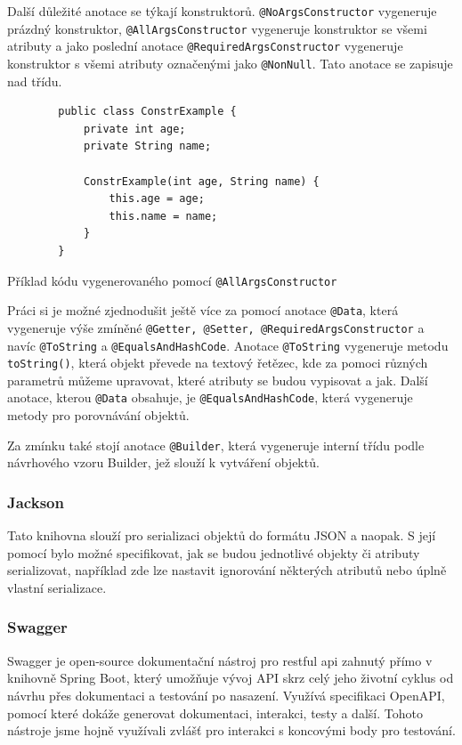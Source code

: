 Další důležité anotace se týkají konstruktorů. \texttt{@NoArgsConstructor} vygeneruje prázdný konstruktor, \texttt{@AllArgsConstructor} vygeneruje konstruktor se všemi atributy  a jako poslední anotace \texttt{@RequiredArgsConstructor} vygeneruje konstruktor s všemi atributy označenými jako \texttt{@NonNull}. Tato anotace se zapisuje nad třídu. \cite{lombok:constructor}

\begin{listing}[h!]
    \begin{verbatim}
        public class ConstrExample {
            private int age;
            private String name;

            ConstrExample(int age, String name) {
                this.age = age;
                this.name = name;
            }
        }
    \end{verbatim}
    \caption{Příklad kódu vygenerovaného pomocí \texttt{@AllArgsConstructor}}
    \label{code:lombok:constructor}
\end{listing}


Práci si je možné zjednodušit ještě více za pomocí anotace \texttt{@Data}, která vygeneruje výše zmíněné \texttt{@Getter, @Setter, @RequiredArgsConstructor} a navíc \texttt{@ToString} a \texttt{@EqualsAndHashCode}.\cite{lombok:data} Anotace \texttt{@ToString} vygeneruje metodu \texttt{toString()}, která objekt převede na textový řetězec, kde za pomoci různých parametrů můžeme upravovat, které atributy se budou vypisovat a jak. Další anotace, kterou \texttt{@Data} obsahuje, je \texttt{@EqualsAndHashCode}, která vygeneruje metody pro porovnávání objektů.

Za zmínku také stojí anotace \texttt{@Builder}, která vygeneruje interní třídu podle návrhového vzoru Builder\cite{refactoringGuru:builder}, jež slouží k vytváření objektů. \cite{lombok:builder}

\subsubsection*{Jackson}\label{sec:impl:jackson}
Tato knihovna slouží pro serializaci objektů do formátu JSON  a naopak. S její pomocí bylo možné specifikovat, jak se budou jednotlivé objekty či atributy serializovat, například zde lze nastavit ignorování některých atributů nebo úplně vlastní serializace.

\subsubsection*{Swagger}\label{sec:impl:swagger}
Swagger je open-source dokumentační nástroj pro \gls{restful api} zahnutý přímo v knihovně Spring Boot, který umožňuje vývoj API skrz celý jeho životní cyklus od návrhu přes dokumentaci a testování po nasazení. Využívá specifikaci OpenAPI, pomocí které dokáže generovat dokumentaci, interakci, testy a další.\cite{swagger:about} Tohoto nástroje jsme hojně využívali zvlášť pro interakci s koncovými body pro testování.

